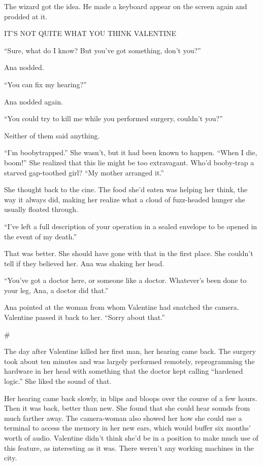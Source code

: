 The wizard got the idea. He made a keyboard appear on the screen
again and prodded at it.

IT’S NOT QUITE WHAT YOU THINK VALENTINE

“Sure, what do I know? But you’ve got something, don’t you?”

Ana nodded.

“You can fix my hearing?”

Ana nodded again.

“You could try to kill me while you performed surgery, couldn’t
you?”

Neither of them said anything.

“I’m boobytrapped.” She wasn’t, but it had been known to happen.
“When I die, boom!” She realized that this lie might be too
extravagant. Who’d booby-trap a starved gap-toothed girl? “My
mother arranged it.”

She thought back to the cine. The food she’d eaten was helping her
think, the way it always did, making her realize what a cloud of
fuzz-headed hunger she usually floated through.

“I’ve left a full description of your operation in a sealed
envelope to be opened in the event of my death.”

That was better. She should have gone with that in the first place.
She couldn’t tell if they believed her. Ana was shaking her head.

“You’ve got a doctor here, or someone like a doctor. Whatever’s
been done to your leg, Ana, a doctor did that.”

Ana pointed at the woman from whom Valentine had snatched the
camera. Valentine passed it back to her. “Sorry about that.”

\#

The day after Valentine killed her first man, her hearing came
back. The surgery took about ten minutes and was largely performed
remotely, reprogramming the hardware in her head with something
that the doctor kept calling “hardened logic.” She liked the sound
of that.

Her hearing came back slowly, in blips and bloops over the course
of a few hours. Then it was back, better than new. She found that
she could hear sounds from much farther away. The camera-woman also
showed her how she could use a terminal to access the memory in her
new ears, which would buffer six months’ worth of audio. Valentine
didn’t think she’d be in a position to make much use of this
feature, as interesting as it was. There weren’t any working
machines in the city.

